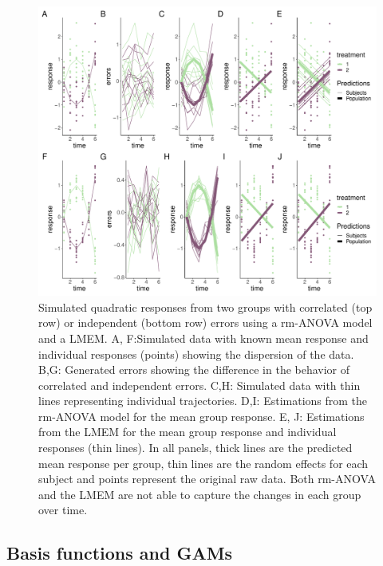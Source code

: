 \documentclass[
]{article}
\begin{document}
\begin{figure}

{\centering \includegraphics[width=1\linewidth]{SIM_Appendix_files/figure-latex/quadratic-cases-Appendix-1} 

}

\caption{Simulated quadratic responses from two groups with correlated (top row) or independent (bottom row) errors using a rm-ANOVA model and a LMEM. A, F:Simulated data with known mean response and individual responses (points) showing the dispersion of the data. B,G: Generated errors showing the difference in the behavior of correlated and independent errors. C,H: Simulated data with thin lines representing individual trajectories. D,I: Estimations from the rm-ANOVA model for the mean group response. E, J: Estimations from the LMEM for the mean group response and individual responses (thin lines). In all panels, thick lines are the predicted mean response per group, thin lines are the random effects for each subject and points represent the original raw data. Both rm-ANOVA and the LMEM are not able to capture the changes in each group over time.}\label{fig:quadratic-cases-Appendix}
\end{figure}

\hypertarget{basis-functions-and-gams}{%
\subsection{Basis functions and GAMs}\label{basis-functions-and-gams}}
\end{document}
